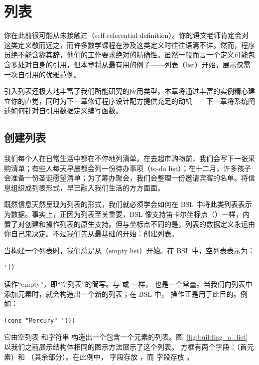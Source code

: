 
\chapter{列表}
\label{sec:ch08_lists}

你在此前很可能从未接触过（self-referential definition）。你的语文老师肯定会对这类定义敬而远之，而许多数学课程在涉及这类定义时往往语焉不详。然而，程序员绝不能含糊其辞，他们的工作要求绝对的精确性。虽然一般而言一个定义可能包含多处对自身的引用，但本章将从最有用的例子——列表（list）开始，展示仅需一次自引用的优雅范例。

引入列表还极大地丰富了我们所能研究的应用类型。本章将通过丰富的实例精心建立你的直觉，同时为下一章修订程序设计配方提供充足的动机——下一章将系统阐述如何针对自引用数据定义编写函数。

\section{创建列表}
\label{sec:ch08_creating_lists}

我们每个人在日常生活中都在不停地列清单。在去超市购物前，我们会写下一张采购清单；有些人每天早晨都会列一份待办事项（to-do list）；在十二月，许多孩子会准备一份圣诞愿望清单；为了筹办聚会，我们会整理一份邀请宾客的名单。将信息组织成列表形式，早已融入我们生活的方方面面。

既然信息天然呈现为列表的形式，我们就必须学会如何在 BSL 中将此类列表表示为数据。事实上，正因为列表至关重要，BSL 像支持笛卡尔坐标点（）一样，内置了对创建和操作列表的原生支持。但与坐标点不同的是，列表的数据定义永远由你自己来决定。不过我们先从最基础的开始：创建列表。

当构建一个列表时，我们总是从（empty list）开始。在 BSL 中，空列表表示为：
\begin{lstlisting}[language=BSL]
'()
\end{lstlisting}
读作“empty”，即“空列表”的简写。与  或  一样， 也是一个常量。当我们向列表中添加元素时，就会构造出一个新的列表；在 BSL 中， 操作正是用于此目的。例如：
\begin{lstlisting}[language=BSL]
(cons "Mercury" '())
\end{lstlisting}
它由空列表  和字符串  构造出一个包含一个元素的列表。图~\ref{fig:building_a_list} 以我们之前展示结构体相同的图示方法展示了这个列表。 方框有两个字段：（首元素）和 （其余部分）。在此例中， 字段存放 ，而  字段存放 。

